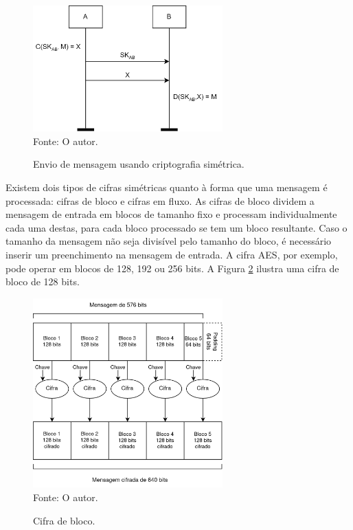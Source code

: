     \begin{figure}[htb!]
        \centering
        \caption{Envio de mensagem usando criptografia simétrica.}
        \includegraphics[width=0.65\textwidth]{Figuras/simetrica.png}\\
        \footnotesize{Fonte: O autor.}
        \label{fig:simetrica}
    \end{figure}

    Existem dois tipos de cifras simétricas quanto à forma que uma mensagem é processada: cifras de bloco e cifras em fluxo. As cifras de bloco dividem a mensagem de entrada em blocos de tamanho fixo e processam individualmente cada uma destas, para cada bloco processado se tem um bloco resultante. Caso o tamanho da mensagem não seja divisível pelo tamanho do bloco, é necessário inserir um preenchimento na mensagem de entrada. A cifra AES, por exemplo, pode operar em blocos de 128, 192 ou 256 bits. A Figura \ref{fig:cifra_bloco} ilustra uma cifra de bloco de 128 bits.

    \begin{figure}[htb!]
        \centering
        \caption{Cifra de bloco.}
        \includegraphics[width=0.65\textwidth]{Figuras/cifra_bloco.png}\\
        \footnotesize{Fonte: O autor.}
        \label{fig:cifra_bloco}
    \end{figure}
    
